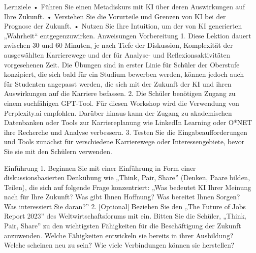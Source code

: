 \documentclass[
  ngerman,
  letterpaper,
  DIV=11]{scrreprt}
\newenvironment{Shaded}{\begin{snugshade}}{\end{snugshade}}
\newcommand{\CommentTok}[1]{\textcolor[rgb]{0.37,0.37,0.37}{#1}}
\newcommand{\NormalTok}[1]{\textcolor[rgb]{0.00,0.23,0.31}{#1}}
\newcommand{\OtherTok}[1]{\textcolor[rgb]{0.00,0.23,0.31}{#1}}
\newcommand{\SpecialStringTok}[1]{\textcolor[rgb]{0.13,0.47,0.30}{#1}}
\begin{document}
\begin{tcolorbox}[enhanced jigsaw, left=2mm, bottomrule=.15mm, arc=.35mm, rightrule=.15mm, colframe=quarto-callout-note-color-frame, coltitle=black, colback=white, toprule=.15mm, toptitle=1mm, colbacktitle=quarto-callout-note-color!10!white, title=\textcolor{quarto-callout-note-color}{\faInfo}\hspace{0.5em}{Copilot-Aufgabe: KI, die Zukunft und Du}, opacitybacktitle=0.6, leftrule=.75mm, bottomtitle=1mm, titlerule=0mm, opacityback=0, breakable]

\begin{Shaded}
\begin{Highlighting}[]

\NormalTok{Lernziele}
\NormalTok{•   Führen Sie einen Metadiskurs mit KI über deren Auswirkungen auf Ihre Zukunft.}
\NormalTok{•   Verstehen Sie die Vorurteile und Grenzen von KI bei der Prognose der Zukunft.}
\NormalTok{•   Nutzen Sie Ihre Intuition, um der von KI generierten „Wahrheit“ entgegenzuwirken.}
\NormalTok{Anweisungen}
\NormalTok{Vorbereitung}
\SpecialStringTok{1.  }\NormalTok{Diese Lektion dauert zwischen 30 und 60 Minuten, je nach Tiefe der Diskussion, Komplexität der ausgewählten Karrierewege und der für Analyse{-} und Reflexionsaktivitäten vorgesehenen Zeit. Die Übungen sind in erster Linie für Schüler der Oberstufe konzipiert, die sich bald für ein Studium bewerben werden, können jedoch auch für Studenten angepasst werden, die sich mit der Zukunft der KI und ihren Auswirkungen auf die Karriere befassen.}
\SpecialStringTok{2.  }\NormalTok{Die Schüler benötigen Zugang zu einem suchfähigen GPT{-}Tool. Für diesen Workshop wird die Verwendung von Perplexity.ai empfohlen. Darüber hinaus kann der Zugang zu akademischen Datenbanken oder Tools zur Karriereplanung wie LinkedIn Learning oder O*NET ihre Recherche und Analyse verbessern.}
\SpecialStringTok{3.  }\NormalTok{Testen Sie die Eingabeaufforderungen und Tools zunächst für verschiedene Karrierewege oder Interessengebiete, bevor Sie sie mit den Schülern verwenden.}

\NormalTok{Einführung}
\SpecialStringTok{1.  }\NormalTok{Beginnen Sie mit einer Einführung in Form einer diskussionsbasierten Denkübung wie „Think, Pair, Share” (Denken, Paare bilden, Teilen), die sich auf folgende Frage konzentriert: „Was bedeutet KI Ihrer Meinung nach für Ihre Zukunft? Was gibt Ihnen Hoffnung? Was bereitet Ihnen Sorgen? Was interessiert Sie daran?”}
\SpecialStringTok{2.  }\CommentTok{[}\OtherTok{Optional}\CommentTok{]}\NormalTok{ Beziehen Sie den „The Future of Jobs Report 2023” des Weltwirtschaftsforums mit ein. Bitten Sie die Schüler, „Think, Pair, Share” zu den wichtigsten Fähigkeiten für die Beschäftigung der Zukunft anzuwenden. Welche Fähigkeiten entwickeln sie bereits in ihrer Ausbildung? Welche scheinen neu zu sein? Wie viele Verbindungen können sie herstellen?}


\end{Highlighting}
\end{Shaded}
\end{tcolorbox}
\end{document}
